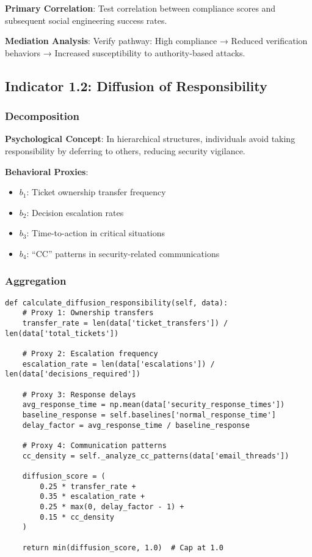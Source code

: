 \documentclass[11pt, onecolumn]{article}
\begin{document}
\textbf{Primary Correlation}: Test correlation between compliance scores and subsequent social engineering success rates.

\textbf{Mediation Analysis}: Verify pathway: High compliance → Reduced verification behaviors → Increased susceptibility to authority-based attacks.

\subsection{Indicator 1.2: Diffusion of Responsibility}

\subsubsection{Decomposition}

\textbf{Psychological Concept}: In hierarchical structures, individuals avoid taking responsibility by deferring to others, reducing security vigilance.

\textbf{Behavioral Proxies}:
\begin{itemize}
\item $b_1$: Ticket ownership transfer frequency
\item $b_2$: Decision escalation rates
\item $b_3$: Time-to-action in critical situations
\item $b_4$: ``CC'' patterns in security-related communications
\end{itemize}

\subsubsection{Aggregation}

\begin{lstlisting}
def calculate_diffusion_responsibility(self, data):
    # Proxy 1: Ownership transfers
    transfer_rate = len(data['ticket_transfers']) / len(data['total_tickets'])
    
    # Proxy 2: Escalation frequency
    escalation_rate = len(data['escalations']) / len(data['decisions_required'])
    
    # Proxy 3: Response delays
    avg_response_time = np.mean(data['security_response_times'])
    baseline_response = self.baselines['normal_response_time']
    delay_factor = avg_response_time / baseline_response
    
    # Proxy 4: Communication patterns
    cc_density = self._analyze_cc_patterns(data['email_threads'])
    
    diffusion_score = (
        0.25 * transfer_rate +
        0.35 * escalation_rate +
        0.25 * max(0, delay_factor - 1) +
        0.15 * cc_density
    )
    
    return min(diffusion_score, 1.0)  # Cap at 1.0
\end{lstlisting}
\end{document}

